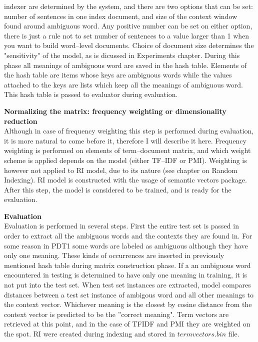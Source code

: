 \begin{description}
indexer are determined by the system, and there are two options that can be set: number of sentences 
in one index document, and size of the context window found around ambiguous word. Any positive number can be set on either option, there is just a rule not to set number of sentences to a value 
larger than 1 when you want to build word--level documents. Choice of document size determines 
the "sensitivity" of the model, as is dicussed in Experiments chapter. During this phase all meanings of
ambiguous word are saved in the hash table. Elements of the hash table are items whose keys are 
ambiguous words while the values attached to the keys are lists which keep all the 
meanings of ambiguous word. This hash table is passed to evaluator during evaluation. 
\item \textbf{Normalizing the matrix: frequency weighting or dimensionality reduction }\hfill \\
Although in case of frequency weighting this step is performed during evaluation, it is more natural to
come before it, therefore I will describe it here. Frequency weighting is performed on elements of 
term--document matrix, and which weight scheme is applied depends on the model (either TF--IDF or 
PMI). Weighting is however not applied to RI model, due to its nature (see chapter on Random Indexing). RI model is constructed with the usage of semantic vectors package. After this step, the model is considered to be trained, and is ready for the evaluation.
\item  \textbf{Evaluation}\hfill \\
Evaluation is performed in several steps. First the entire test set is passed in order to extract all the 
ambiguous words and the contexts they are found in. For some reason in PDT1 some words are labeled
as ambiguous although they have only one meaning. These kinds of occurrences are inserted in 
previously mentioned hash table during matrix construction phase. If a an ambiguous word encountered 
in testing is determined to have only one meaning in training, it is not put into the test set. 
When test set instances are extracted, model compares distances between a test set instance of 
ambigous word and all other meanings to the context vector. Whichever meaning is the closest by 
cosine distance from the context vector is predicted to be the ''correct meaning". Term vectors are retrieved at this point, and in the case of TFIDF and PMI they are weighted on the spot. RI were
created during indexing and stored in $termvectors.bin$ file.   
\end{description}